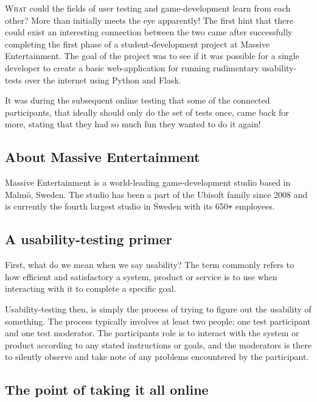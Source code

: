 \documentclass{article}
\begin{document}
  \begin{multicols*}{2}[]
    \lettrine{W}{hat} could the fields of user testing and game-development learn from each
    other? More than initially meets the eye apparently! The first hint that
    there could exist an interesting connection between the two came after
    successfully completing the first phase of a student-development project at
    Massive Entertainment. The goal of the project was to see if it was
    possible for a single developer to create a basic web-application for
    running rudimentary usability-tests over the internet using Python and
    Flask.

    It was during the subsequent online testing that some of the connected
    participants, that ideally should only do the set of tests once, came back
    for more, stating that they had so much fun they wanted to do it again!

  \subsection*{About Massive Entertainment}

    Massive Entertainment is a world-leading game-development studio
    based in Malmö, Sweden. The studio has been a part of the Ubisoft family
    since 2008 and is currently the fourth largest studio in Sweden with its
    650\texttt{+} employees.

  \subsection*{A usability-testing primer}

    First, what do we mean when we say usability? The term commonly refers to
    how efficient and satisfactory a system, product or service is to use when
    interacting with it to complete a specific goal.

    Usability-testing then, is simply the process of trying to figure out the
    usability of something. The process typically involves at least two people;
    one test participant and one test moderator. The participants role is to
    interact with the system or product according to any stated instructions or
    goals, and the moderators is there to silently observe and take note of any
    problems encountered by the participant.

  \subsection*{The point of taking it all online}


\end{multicols*}
\end{document}
